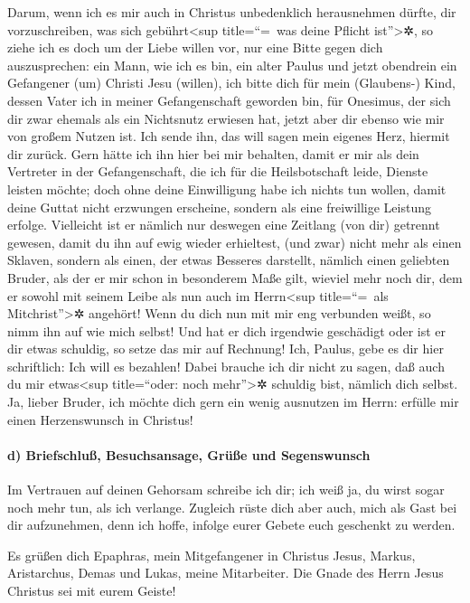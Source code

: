  Darum, wenn ich es mir auch in Christus unbedenklich
herausnehmen dürfte, dir vorzuschreiben, was sich gebührt\textless sup
title=``=~was deine Pflicht ist''\textgreater✲,  so ziehe
ich es doch um der Liebe willen vor, nur eine Bitte gegen dich
auszusprechen: ein Mann, wie ich es bin, ein alter Paulus und jetzt
obendrein ein Gefangener (um) Christi Jesu (willen),  ich
bitte dich für mein (Glaubens-) Kind, dessen Vater ich in meiner
Gefangenschaft geworden bin, für Onesimus,  der sich dir
zwar ehemals als ein Nichtsnutz erwiesen hat, jetzt aber dir ebenso wie
mir von großem Nutzen ist.  Ich sende ihn, das will sagen
mein eigenes Herz, hiermit dir zurück.  Gern hätte ich
ihn hier bei mir behalten, damit er mir als dein Vertreter in der
Gefangenschaft, die ich für die Heilsbotschaft leide, Dienste leisten
möchte;  doch ohne deine Einwilligung habe ich nichts tun
wollen, damit deine Guttat nicht erzwungen erscheine, sondern als eine
freiwillige Leistung erfolge.  Vielleicht ist er nämlich
nur deswegen eine Zeitlang (von dir) getrennt gewesen, damit du ihn auf
ewig wieder erhieltest,  (und zwar) nicht mehr als einen
Sklaven, sondern als einen, der etwas Besseres darstellt, nämlich einen
geliebten Bruder, als der er mir schon in besonderem Maße gilt, wieviel
mehr noch dir, dem er sowohl mit seinem Leibe als nun auch im
Herrn\textless sup title=``=~als Mitchrist''\textgreater✲ angehört!
 Wenn du dich nun mit mir eng verbunden weißt, so nimm
ihn auf wie mich selbst!  Und hat er dich irgendwie
geschädigt oder ist er dir etwas schuldig, so setze das mir auf
Rechnung!  Ich, Paulus, gebe es dir hier schriftlich: Ich
will es bezahlen! Dabei brauche ich dir nicht zu sagen, daß auch du mir
etwas\textless sup title=``oder: noch mehr''\textgreater✲ schuldig bist,
nämlich dich selbst.  Ja, lieber Bruder, ich möchte dich
gern ein wenig ausnutzen im Herrn: erfülle mir einen Herzenswunsch in
Christus!

\hypertarget{d-briefschluuxdf-besuchsansage-gruxfcuxdfe-und-segenswunsch}{%
\paragraph{d) Briefschluß, Besuchsansage, Grüße und
Segenswunsch}\label{d-briefschluuxdf-besuchsansage-gruxfcuxdfe-und-segenswunsch}}

 Im Vertrauen auf deinen Gehorsam schreibe ich dir; ich
weiß ja, du wirst sogar noch mehr tun, als ich verlange. 
Zugleich rüste dich aber auch, mich als Gast bei dir aufzunehmen, denn
ich hoffe, infolge eurer Gebete euch geschenkt zu werden.

 Es grüßen dich Epaphras, mein Mitgefangener in Christus
Jesus,  Markus, Aristarchus, Demas und Lukas, meine
Mitarbeiter.  Die Gnade des Herrn Jesus Christus sei mit
eurem Geiste!
